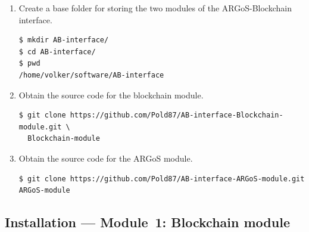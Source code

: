 \documentclass{article}
\begin{document}
\begin{enumerate}[leftmargin=*]
\item Create a base folder for storing the two modules of the
  ARGoS-Blockchain interface.
\begin{verbatim}
$ mkdir AB-interface/
$ cd AB-interface/
$ pwd
/home/volker/software/AB-interface
\end{verbatim}

\item Obtain the source code for the blockchain module.
\begin{verbatim}
$ git clone https://github.com/Pold87/AB-interface-Blockchain-module.git \ 
  Blockchain-module
\end{verbatim}

\item Obtain the source code for the ARGoS module.
\begin{verbatim}
$ git clone https://github.com/Pold87/AB-interface-ARGoS-module.git ARGoS-module
\end{verbatim}
\end{enumerate}

\subsection{Installation --- Module~1: Blockchain module}
\end{document}
